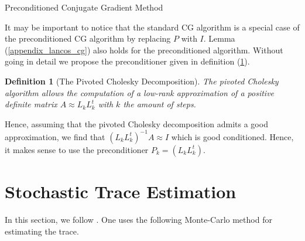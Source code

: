 \documentclass[12pt,a4paper,oneside]{book}
\makeatletter
\newtheorem{Definition}{Definition}
\def\BState{\State\hskip-\ALG@thistlm}
\makeatother
\begin{document}
\begin{algorithm}
\caption{Preconditioned Conjugate Gradient Method}\label{p_c_g_algorithm}
\end{algorithm}

It may be important to notice that the standard CG algorithm is a special case of the preconditioned CG algorithm by replacing $P$ with $I$. Lemma (\ref{appendix_lancos_cg}) also holds for the preconditioned algorithm. Without going in detail we propose the preconditioner given in definition (\ref{pivot_chol}). 

\begin{Definition}[The Pivoted Cholesky Decomposition] \label{pivot_chol}
The pivoted Cholesky algorithm allows the computation of a low-rank approximation of a positive definite matrix $A\approx L_k L_k^t$ with $k$ the amount of steps. 
\end{Definition}

Hence, assuming that the pivoted Cholesky decomposition admits a good approximation, we find that $ (L_k L_k^t)^{-1} A \approx I $ which is good conditioned. Hence, it makes sense to use the preconditioner $P_k = (L_k L_k^t)$. 


\section{Stochastic Trace Estimation} \label{appendix_stoch_trace}

In this section, we follow \cite{hutchinson1990stochastic}. One uses the following Monte-Carlo method for estimating the trace. 
\end{document}
